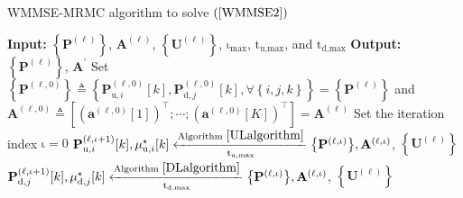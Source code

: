 \documentclass[10pt,journal]{IEEEtran}
\newcommand{\paren}[1]{\left({#1}\right)}
\newcommand{\bracket}[1]{{\left [{#1}\right ]}}
\newcommand{\braces}[1]{{\left\{ {#1}\right\}}}
\theoremstyle{definition}
\begin{document}
\begin{algorithm}[ht!]
	\caption{WMMSE-MRMC algorithm to solve $\paren{\ref{WMMSE2}}$}
	\label{convexalgorithm}
	\begin{algorithmic}[1]
		\Statex \textbf{Input:} $\braces{\mathbf{P}^{\paren{\mathrm{\ell}}}}$, $\mathbf{A}^{\paren{\mathrm{\ell}}}$, $\braces{\mathbf{U}^{\paren{\mathrm{\ell}}}}$, $\mathrm{\iota}_{\textrm{max}}$, $\mathrm{t}_{\textrm{u,max}}$, and $\mathrm{t}_{\textrm{d,max}}$
		\Statex \textbf{Output: } $\braces{\mathbf{P}^{\paren{\ell}}}$, $\mathbf{A}^{\prime}$
		\State Set $\braces{\mathbf{P}^{\paren{\mathrm{\ell,0}}}}\triangleq\braces{\mathbf{P}^{\paren{\mathrm{\ell,0}}}_{\textrm{u},i}\bracket{k},\mathbf{P}^{\paren{\mathrm{\ell,0}}}_{\textrm{d},j}\bracket{k}, \forall \braces{i,j,k}}=\braces{\mathbf{P}^{\paren{\mathrm{\ell}}}}
		$ and $\mathbf{A}^{\paren{\mathrm{\ell,0}}}\triangleq\bracket{\paren{\mathbf{a}^{\paren{\mathrm{\ell,0}}}\bracket{1}}^\top;\cdots;\paren{\mathbf{a}^{\paren{\mathrm{\ell,0}}}\bracket{\mathrm{\mathit{K}}}}^\top}=\mathbf{A}^{\paren{\mathrm{\ell}}}$
		\State Set the iteration index $\mathrm{\iota}=0$ 
		\Repeat
		\label{stepk} %
		\State $\mathbf{P}^{\paren{\mathrm{\ell,\iota+1}}}_{\textrm{u},i}\bracket{k},\mu^\star_{\textrm{u},i}\bracket{k}\xleftarrow[\mathrm{t}_{\textrm{u,max}}]{\textrm{Algorithm }\ref{ULalgorithm}}\braces{\mathbf{P}^{\paren{\mathrm{\ell,\iota}}}},\mathbf{A}^{\paren{\mathrm{\ell,\iota}}}$, $\braces{\mathbf{U}^{\paren{\mathrm{\ell}}}}$
		\EndFor
		\State %
		$\mathbf{P}^{\paren{\mathrm{\ell,\iota+1}}}_{\textrm{d},j}\bracket{k},\mu^\star_{\textrm{d},j}\bracket{k}\xleftarrow[\mathrm{t}_{\textrm{d,max}}]{\textrm{Algorithm }\ref{DLalgorithm}}\braces{\mathbf{P}^{\paren{\mathrm{\ell,\iota}}}},\mathbf{A}^{\paren{\mathrm{\ell,\iota}}}$, $\braces{\mathbf{U}^{\paren{\mathrm{\ell}}}}$

\end{algorithmic}
\end{algorithm}
\end{document}
